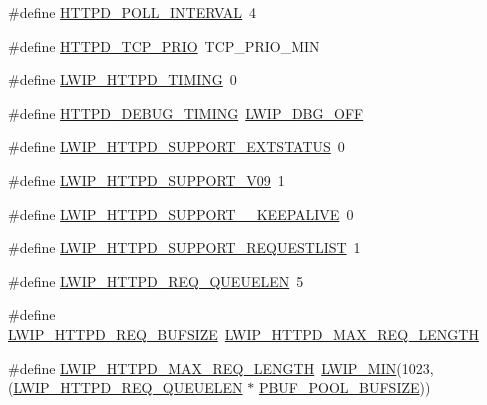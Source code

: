 \begin{DoxyCompactItemize}
\item 
\#define \hyperlink{group__httpd__opts_gacc3e7667baa2cfafd23de2b152df7a63}{H\+T\+T\+P\+D\+\_\+\+P\+O\+L\+L\+\_\+\+I\+N\+T\+E\+R\+V\+AL}~4
\item 
\#define \hyperlink{group__httpd__opts_gaabd1f6319d04b8d5f2c93270794d5182}{H\+T\+T\+P\+D\+\_\+\+T\+C\+P\+\_\+\+P\+R\+IO}~T\+C\+P\+\_\+\+P\+R\+I\+O\+\_\+\+M\+IN
\item 
\#define \hyperlink{group__httpd__opts_ga054db3f080715942967969c6ae30bb6a}{L\+W\+I\+P\+\_\+\+H\+T\+T\+P\+D\+\_\+\+T\+I\+M\+I\+NG}~0
\item 
\#define \hyperlink{group__httpd__opts_ga5f2642874f930798d975b1f7a6d2e1da}{H\+T\+T\+P\+D\+\_\+\+D\+E\+B\+U\+G\+\_\+\+T\+I\+M\+I\+NG}~\hyperlink{group__debugging__levels_gadab1cdc3f45939a3a5c9a3d7e04987e1}{L\+W\+I\+P\+\_\+\+D\+B\+G\+\_\+\+O\+FF}
\item 
\#define \hyperlink{group__httpd__opts_ga85ebddbc4236b1e31bfa68fa163f9b07}{L\+W\+I\+P\+\_\+\+H\+T\+T\+P\+D\+\_\+\+S\+U\+P\+P\+O\+R\+T\+\_\+\+E\+X\+T\+S\+T\+A\+T\+US}~0
\item 
\#define \hyperlink{group__httpd__opts_ga7a8f4ab787b6fb8482c8a36c9fd0c7dd}{L\+W\+I\+P\+\_\+\+H\+T\+T\+P\+D\+\_\+\+S\+U\+P\+P\+O\+R\+T\+\_\+\+V09}~1
\item 
\#define \hyperlink{group__httpd__opts_ga6f78487bc829f7f98274f1264020045e}{L\+W\+I\+P\+\_\+\+H\+T\+T\+P\+D\+\_\+\+S\+U\+P\+P\+O\+R\+T\+\_\+\_\+\+K\+E\+E\+P\+A\+L\+I\+VE}~0
\item 
\#define \hyperlink{group__httpd__opts_ga0bd0f9a89423fb3bbfea4e4c6141ae43}{L\+W\+I\+P\+\_\+\+H\+T\+T\+P\+D\+\_\+\+S\+U\+P\+P\+O\+R\+T\+\_\+\+R\+E\+Q\+U\+E\+S\+T\+L\+I\+ST}~1
\item 
\#define \hyperlink{group__httpd__opts_gaef23f4e3525aa5dd0ecbce9b5e16d4e0}{L\+W\+I\+P\+\_\+\+H\+T\+T\+P\+D\+\_\+\+R\+E\+Q\+\_\+\+Q\+U\+E\+U\+E\+L\+EN}~5
\item 
\#define \hyperlink{group__httpd__opts_ga8dbe61a35228da0e7365a088197191b8}{L\+W\+I\+P\+\_\+\+H\+T\+T\+P\+D\+\_\+\+R\+E\+Q\+\_\+\+B\+U\+F\+S\+I\+ZE}~\hyperlink{group__httpd__opts_ga30dc71c59f3904df7daaf293f74f91f8}{L\+W\+I\+P\+\_\+\+H\+T\+T\+P\+D\+\_\+\+M\+A\+X\+\_\+\+R\+E\+Q\+\_\+\+L\+E\+N\+G\+TH}
\item 
\#define \hyperlink{group__httpd__opts_ga30dc71c59f3904df7daaf293f74f91f8}{L\+W\+I\+P\+\_\+\+H\+T\+T\+P\+D\+\_\+\+M\+A\+X\+\_\+\+R\+E\+Q\+\_\+\+L\+E\+N\+G\+TH}~\hyperlink{openmote-cc2538_2lwip_2src_2include_2lwip_2def_8h_a748f5df614a3fc989e8900fd229d6e4e}{L\+W\+I\+P\+\_\+\+M\+IN}(1023, (\hyperlink{group__httpd__opts_gaef23f4e3525aa5dd0ecbce9b5e16d4e0}{L\+W\+I\+P\+\_\+\+H\+T\+T\+P\+D\+\_\+\+R\+E\+Q\+\_\+\+Q\+U\+E\+U\+E\+L\+EN} $\ast$ \hyperlink{group__lwip__opts__pbuf_gae61f4491d56e805e79b79eb5d35a00e5}{P\+B\+U\+F\+\_\+\+P\+O\+O\+L\+\_\+\+B\+U\+F\+S\+I\+ZE}))

\end{DoxyCompactItemize}
